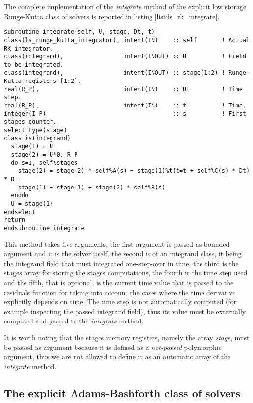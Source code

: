 \documentclass[pdftex,preprint,3p,times,numbers]{elsarticle}
\begin{document}
The complete implementation of the \emph{integrate} method of the explicit low storage Runge-Kutta class of solvers is reported in listing \ref{list:ls_rk_integrate}.

\begin{lstlisting}[firstnumber=1,style=code,caption={implementation of the \emph{integrate} method of explicit low storage Runge-Kutta class},label={list:ls_rk_integrate}]
subroutine integrate(self, U, stage, Dt, t)
class(ls_runge_kutta_integrator), intent(IN)    :: self       ! Actual RK integrator.
class(integrand),                 intent(INOUT) :: U          ! Field to be integrated.
class(integrand),                 intent(INOUT) :: stage(1:2) ! Runge-Kutta registers [1:2].
real(R_P),                        intent(IN)    :: Dt         ! Time step.
real(R_P),                        intent(IN)    :: t          ! Time.
integer(I_P)                                    :: s          ! First stages counter.
select type(stage)
class is(integrand)
  stage(1) = U
  stage(2) = U*0._R_P
  do s=1, self%stages
    stage(2) = stage(2) * self%A(s) + stage(1)%t(t=t + self%C(s) * Dt) * Dt
    stage(1) = stage(1) + stage(2) * self%B(s)
  enddo
  U = stage(1)
endselect
return
endsubroutine integrate
\end{lstlisting}

This method takes five arguments, the first argument is passed as bounded argument and it is the solver itself, the second is of an integrand class, it being the integrand field that must integrated one-step-over in time, the third is the stages array for storing the stages computations, the fourth is the time step used and the fifth, that is optional, is the current time value that is passed to the residuals function for taking into account the cases where the time derivative explicitly depends on time. The time step is not automatically computed (for example inspecting the passed integrand field), thus its value must be externally computed and passed to the \emph{integrate} method.

It is worth noting that the stages memory registers, namely the array \emph{stage}, must be passed as argument because it is defined as a \emph{not-passed} polymorphic argument, thus we are not allowed to define it as an automatic array of the \emph{integrate} method.

\subsection{The explicit Adams-Bashforth class of solvers}\label{subsec:solver_ab}
\end{document}
